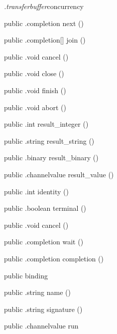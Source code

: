 \begin{CrexxClass}{\textit{.transferbuffer}}{concurrency}
\begin{Members}
    \Method
      {public}
      {.completion}
      {next}
      {()}

    \Method
      {public}
      {.completion[]}
      {join}
      {()}

    \Method
      {public}
      {.void}
      {cancel}
      {()}

    \Method
      {public}
      {.void}
      {close}
      {()}

    \Method
      {public}
      {.void}
      {finish}
      {()}

    \Method
      {public}
      {.void}
      {abort}
      {()}

    \Method
      {public}
      {.int}
      {result\_integer}
      {()}

    \Method
      {public}
      {.string}
      {result\_string}
      {()}

    \Method
      {public}
      {.binary}
      {result\_binary}
      {()}

    \Method
      {public}
      {.channelvalue}
      {result\_value}
      {()}

    \Method
      {public}
      {.int}
      {identity}
      {()}

    \Method
      {public}
      {.boolean}
      {terminal}
      {()}

    \Method
      {public}
      {.void}
      {cancel}
      {()}

    \Method
      {public}
      {.completion}
      {wait}
      {()}

    \Method
      {public}
      {.completion}
      {completion}
      {()}

    \Factory
      {public}
      {binding}
      {}

    \Method
      {public}
      {.string}
      {name}
      {()}

    \Method
      {public}
      {.string}
      {signature}
      {()}

    \Method
      {public}
      {.channelvalue}
      {run}
      {}


\end{Members}
\end{CrexxClass}
